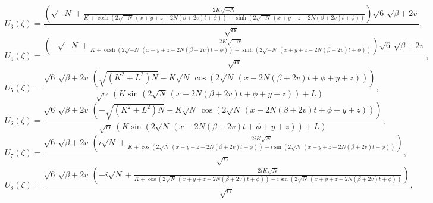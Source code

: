 \documentclass[10pt]{NSP1}
\numberwithin{equation}{section}
\begin{document}
\begin{equation}\label{U3}
    U_{3}\! \left(\zeta \right) =
\frac{\left(\sqrt{-N}+\frac{2 K \sqrt{-N}}{K +\cosh \left(2 \sqrt{-N}\, \left(x + y + z  -2 N \left(\beta +2 v \right) t +\phi \right)\right)-\sinh \left(2 \sqrt{-N}\, \left(x + y + z  -2 N \left(\beta +2 v \right) t +\phi \right)\right)}\right) \sqrt{6}\, \sqrt{\beta +2 v}}{\sqrt{\alpha}},
\end{equation}
\begin{equation}\label{U4}
    U_{4}\! \left(\zeta \right) =
\frac{\left(-\sqrt{-N}+\frac{2 K \sqrt{-N}}{K +\cosh \left(2 \sqrt{-N}\, \left(x + y + z  -2 N \left(\beta +2 v \right) t +\phi \right)\right)-\sinh \left(2 \sqrt{-N}\, \left(x + y + z  -2 N \left(\beta +2 v \right) t +\phi \right)\right)}\right) \sqrt{6}\, \sqrt{\beta +2 v}}{\sqrt{\alpha}},
\end{equation}
\begin{equation}\label{U5}
    U_{5} \! \left(\zeta \right) =
\frac{\sqrt{6}\, \sqrt{\beta +2 v}\, \left(\sqrt{\left(K^{2}+L^{2}\right) N}-K \sqrt{N}\, \cos \! \left(2 \sqrt{N}\, \left(x -2 N \left(\beta +2 v \right) t +\phi +y +z \right)\right)\right)}{\sqrt{\alpha}\, \left(K \sin \! \left(2 \sqrt{N}\, \left(x -2 N \left(\beta +2 v \right) t +\phi +y +z \right)\right)+L \right)},
\end{equation}
\begin{equation}\label{U6}
    U_{6} \! \left(\zeta \right) =
\frac{\sqrt{6}\, \sqrt{\beta +2 v}\, \left(-\sqrt{\left(K^{2}+L^{2}\right) N}-K \sqrt{N}\, \cos \! \left(2 \sqrt{N}\, \left(x -2 N \left(\beta +2 v \right) t +\phi +y +z \right)\right)\right)}{\sqrt{\alpha}\, \left(K \sin \! \left(2 \sqrt{N}\, \left(x -2 N \left(\beta +2 v \right) t +\phi +y +z \right)\right)+L \right)},
\end{equation}
\begin{equation}\label{U7}
    U_{7} \! \left(\zeta \right) =
\frac{\sqrt{6}\, \sqrt{\beta +2 v}\, \left(i \sqrt{N}+\frac{2 i K \sqrt{N}}{K +\cos \left(2 \sqrt{N}\, \left(x +y +z -2 N \left(\beta +2 v \right) t +\phi \right)\right)-i \sin \left(2 \sqrt{N}\, \left(x +y +z -2 N \left(\beta +2 v \right) t +\phi \right)\right)}\right)}{\sqrt{\alpha}},
\end{equation}
\begin{equation}\label{U8}
    U_{8} \! \left(\zeta \right) =
\frac{\sqrt{6}\, \sqrt{\beta +2 v}\, \left(-i \sqrt{N}+\frac{2 i K \sqrt{N}}{K +\cos \left(2 \sqrt{N}\, \left(x +y +z -2 N \left(\beta +2 v \right) t +\phi \right)\right)-i \sin \left(2 \sqrt{N}\, \left(x +y +z -2 N \left(\beta +2 v \right) t +\phi \right)\right)}\right)}{\sqrt{\alpha}},
\end{equation}
\end{document}
